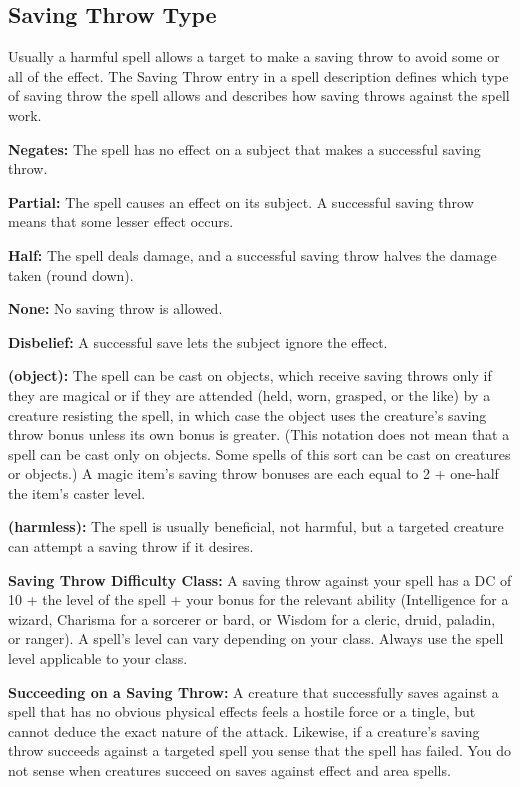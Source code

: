 \subsection{Saving Throw Type}

Usually a harmful spell allows a target to make a saving throw to avoid some or 
all of the effect. The Saving Throw entry in a spell description defines which 
type of saving throw the spell allows and describes how saving throws against the 
spell work.

\textbf{Negates:} The spell has no effect on a subject that makes a successful 
saving throw.

\textbf{Partial:} The spell causes an effect on its subject. A successful saving 
throw means that some lesser effect occurs.

\textbf{Half:} The spell deals damage, and a successful saving throw halves the 
damage taken (round down).

\textbf{None:} No saving throw is allowed.

\textbf{Disbelief:} A successful save lets the subject ignore the effect. 

\textbf{(object):} The spell can be cast on objects, which receive saving throws 
only if they are magical or if they are attended (held, worn, grasped, or the like) 
by a creature resisting the spell, in which case the object uses the creature's 
saving throw bonus unless its own bonus is greater. (This notation does not mean 
that a spell can be cast only on objects. Some spells of this sort can be cast 
on creatures or objects.) A magic item's saving throw bonuses are each equal to 
2 + one-half the item's caster level. 

\textbf{(harmless):} The spell is usually beneficial, not harmful, but a targeted 
creature can attempt a saving throw if it desires.

\textbf{Saving Throw Difficulty Class:} A saving throw against your spell has a 
DC of 10 + the level of the spell + your bonus for the relevant ability (Intelligence 
for a wizard, Charisma for a sorcerer or bard, or Wisdom for a cleric, druid, paladin, 
or ranger). A spell's level can vary depending on your class. Always use the spell 
level applicable to your class.

\textbf{Succeeding on a Saving Throw:} A creature that successfully saves against 
a spell that has no obvious physical effects feels a hostile force or a tingle, 
but cannot deduce the exact nature of the attack. Likewise, if a creature's saving 
throw succeeds against a targeted spell you sense that the spell has failed. You 
do not sense when creatures succeed on saves against effect and area spells.

